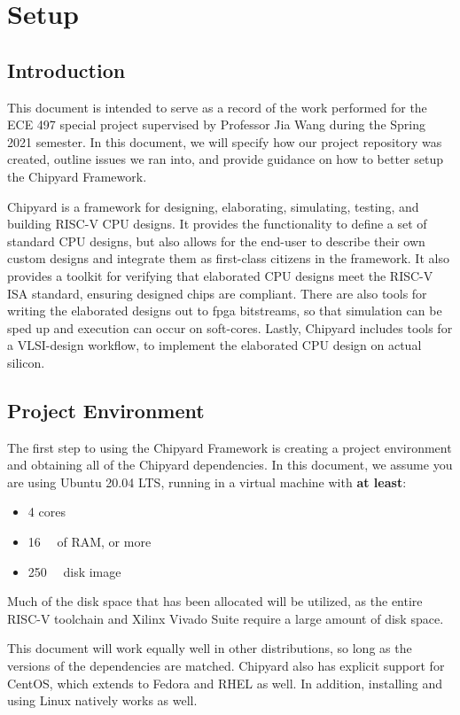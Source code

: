 \chapter{Setup}\label{chap:Setup}
\section{Introduction}\label{sec:Introduction}
This document is intended to serve as a record of the work performed for the ECE 497 special project supervised by Professor Jia Wang during the Spring 2021 semester.
In this document, we will specify how our project repository was created, outline issues we ran into, and provide guidance on how to better setup the Chipyard Framework.

Chipyard is a framework for designing, elaborating, simulating, testing, and building RISC-V CPU designs.
It provides the functionality to define a set of standard CPU designs, but also allows for the end-user to describe their own custom designs and integrate them as first-class citizens in the framework.
It also provides a toolkit for verifying that elaborated CPU designs meet the RISC-V ISA standard, ensuring designed chips are compliant.
There are also tools for writing the elaborated designs out to \gls{fpga} bitstreams, so that simulation can be sped up and execution can occur on \gls{soft-core}s.
Lastly, Chipyard includes tools for a VLSI-design workflow, to implement the elaborated CPU design on actual silicon.

\section{Project Environment}\label{chap:Project_Environment}
The first step to using the Chipyard Framework is creating a project environment and obtaining all of the Chipyard dependencies.
In this document, we assume you are using Ubuntu 20.04 LTS, running in a virtual machine with \textbf{at least}:
\begin{itemize}
\item 4 cores
\item \SI{16}{\giga\byte} of RAM, or more
\item \SI{250}{\giga\byte} disk image
\end{itemize}

Much of the disk space that has been allocated will be utilized, as the entire RISC-V toolchain and Xilinx Vivado Suite require a large amount of disk space.

This document will work equally well in other distributions, so long as the versions of the dependencies are matched.
Chipyard also has explicit support for CentOS, which extends to Fedora and RHEL as well.
In addition, installing and using Linux natively works as well.

